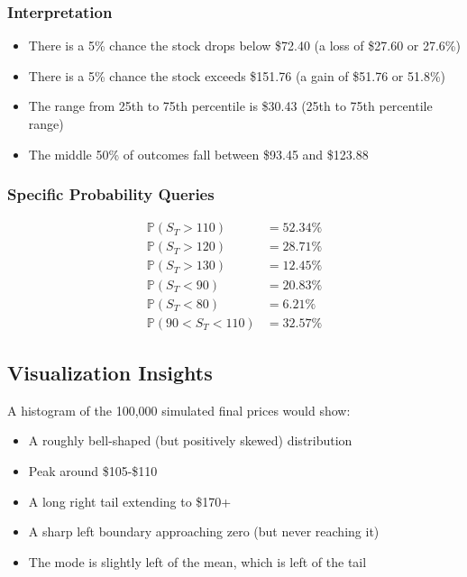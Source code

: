 \documentclass[12pt,a4paper]{article}
\begin{document}
\subsubsection{Interpretation}

\begin{itemize}
    \item There is a 5\% chance the stock drops below \$72.40 (a loss of \$27.60 or 27.6\%)
    \item There is a 5\% chance the stock exceeds \$151.76 (a gain of \$51.76 or 51.8\%)
    \item The range from 25th to 75th percentile is \$30.43 (25th to 75th percentile range)
    \item The middle 50\% of outcomes fall between \$93.45 and \$123.88
\end{itemize}

\subsubsection{Specific Probability Queries}

\begin{align}
\mathbb{P}(S_T > 110) &= 52.34\% \\
\mathbb{P}(S_T > 120) &= 28.71\% \\
\mathbb{P}(S_T > 130) &= 12.45\% \\
\mathbb{P}(S_T < 90) &= 20.83\% \\
\mathbb{P}(S_T < 80) &= 6.21\% \\
\mathbb{P}(90 < S_T < 110) &= 32.57\%
\end{align}

\subsection{Visualization Insights}

A histogram of the 100,000 simulated final prices would show:
\begin{itemize}
    \item A roughly bell-shaped (but positively skewed) distribution
    \item Peak around \$105-\$110
    \item A long right tail extending to \$170+
    \item A sharp left boundary approaching zero (but never reaching it)
    \item The mode is slightly left of the mean, which is left of the tail
\end{itemize}
\end{document}
